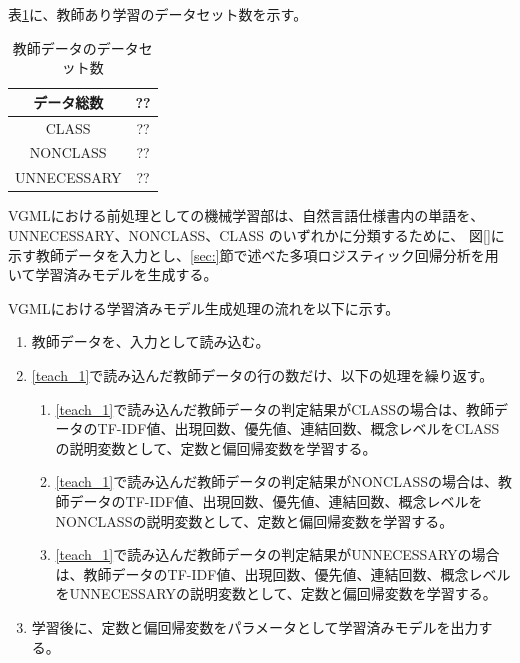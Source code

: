 表\ref{table:data_set}に、教師あり学習のデータセット数を示す。

\begin{table}[t]
    \begin{center}
      \caption{教師データのデータセット数}
      \label{table:data_set}
      \begin{tabular}{c|c}
        データ総数　& ??\\
        \hline
        \hline
        CLASS      & ??\\ \hline
        NONCLASS & ??\\ \hline
        UNNECESSARY   & ??\\ \hline
      \end{tabular}
    \end{center}
  \end{table}

VGMLにおける前処理としての機械学習部は、自然言語仕様書内の単語を、UNNECESSARY、NONCLASS、CLASS のいずれかに分類するために、
図\ref{}に示す教師データを入力とし、\ref{sec:}節で述べた多項ロジスティック回帰分析を用いて学習済みモデルを生成する。

VGMLにおける学習済みモデル生成処理の流れを以下に示す。

\begin{enumerate}
	\item 教師データを、入力として読み込む。
    \label{teach_1}
	\item \ref{teach_1}で読み込んだ教師データの行の数だけ、以下の処理を繰り返す。
        \begin{enumerate}
            \item \ref{teach_1}で読み込んだ教師データの判定結果がCLASSの場合は、教師データのTF-IDF値、出現回数、優先値、連結回数、概念レベルをCLASSの説明変数として、定数と偏回帰変数を学習する。
            \item \ref{teach_1}で読み込んだ教師データの判定結果がNONCLASSの場合は、教師データのTF-IDF値、出現回数、優先値、連結回数、概念レベルをNONCLASSの説明変数として、定数と偏回帰変数を学習する。
            \item \ref{teach_1}で読み込んだ教師データの判定結果がUNNECESSARYの場合は、教師データのTF-IDF値、出現回数、優先値、連結回数、概念レベルをUNNECESSARYの説明変数として、定数と偏回帰変数を学習する。
        \end{enumerate}
	\item 学習後に、定数と偏回帰変数をパラメータとして学習済みモデルを出力する。
\end{enumerate}

